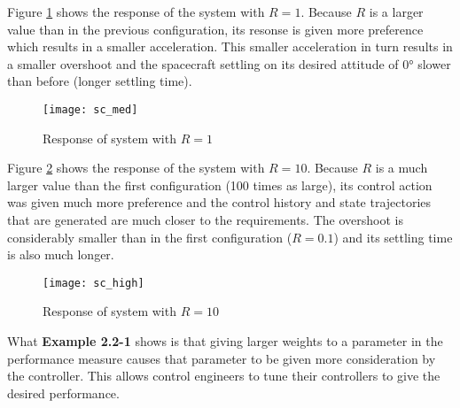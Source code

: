 Figure \ref{fig:sc_med} shows the response of the system with $R = 1$.
Because $R$ is a larger value than in the previous configuration, its resonse
is given more preference which results in a smaller acceleration. This smaller
acceleration in turn results in a smaller overshoot and the spacecraft settling
on its desired attitude of $\ang{0}$ slower than before (longer settling time).

\begin{figure}[H]
    \texttt{[image: sc\_med]}
    \centering
    \caption{Response of system with $R = 1$ \cite{kirkdover}}
    \label{fig:sc_med}
\end{figure}

Figure \ref{fig:sc_high} shows the response of the system with $R = 10$.
Because $R$ is a much larger value than the first configuration (100 times as
large), its control action was given much more preference and the control
history and state trajectories that are generated are much closer to the
requirements. The overshoot is considerably smaller than in the first
configuration ($R = 0.1$) and its settling time is also much longer.

\begin{figure}[H]
    \texttt{[image: sc\_high]}
    \centering
    \caption{Response of system with $R = 10$ \cite{kirkdover}}
    \label{fig:sc_high}
\end{figure}

What \textbf{Example 2.2-1} shows is that giving larger weights to a parameter
in the performance measure causes that parameter to be given more
consideration by the controller. This allows control engineers to tune their
controllers to give the desired performance.
